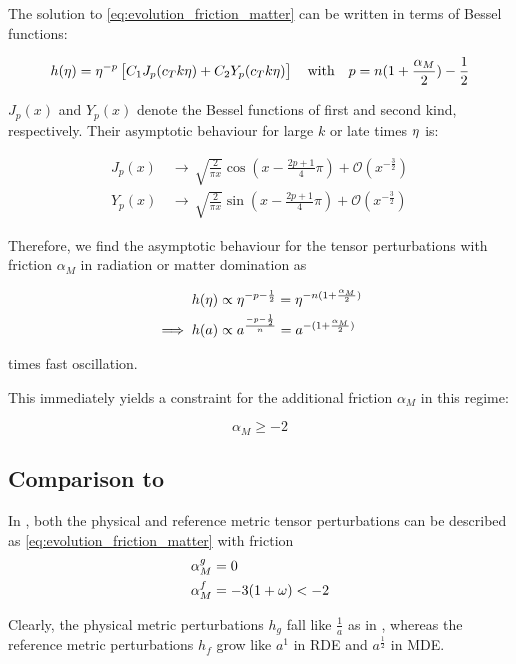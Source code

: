 \documentclass[parskip=half]{scrreprt}
\begin{document}
The solution to \ref{eq:evolution_friction_matter} can be written in terms of Bessel functions:

\begin{equation}
	h(\eta) = \eta^{-p} \left[C_1 J_p(c_T k \eta) + C_2 Y_p(c_T k \eta) \right] \quad \textrm{with} \quad p = n(1+\frac{\alpha_M}{2})-\frac{1}{2}
\end{equation}

$J_p(x)$ and $Y_p(x)$ denote the Bessel functions of first and second kind, respectively. Their asymptotic behaviour for large $k$ or late times $\eta$ is:

\begin{align}
	J_p(x) \, &\rightarrow \, \sqrt{\frac{2}{\pi x}} \cos(x-\frac{2p+1}{4}\pi) + \mathcal{O}(x^{-\frac{3}{2}}) \\
	Y_p(x) \, &\rightarrow \, \sqrt{\frac{2}{\pi x}} \sin(x-\frac{2p+1}{4}\pi) + \mathcal{O}(x^{-\frac{3}{2}})
\end{align}

Therefore, we find the asymptotic behaviour for the tensor perturbations with friction $\alpha_M$ in radiation or matter domination as

\begin{align}
	h(\eta) &\propto \eta^{-p-\frac{1}{2}} = \eta^{-n(1+\frac{\alpha_M}{2})} \\
	\implies h(a) &\propto a^{\frac{-p-\frac{1}{2}}{n}} = a^{-(1+\frac{\alpha_M}{2})}
\end{align}

times fast oscillation.

This immediately yields a constraint for the additional friction $\alpha_M$ in this regime:

\begin{equation}
	\alpha_M \geq -2
\end{equation}


\subsection{Comparison to \cite{Amendola2015}}

In \citep{Amendola2015}, both the physical and reference metric tensor perturbations can be described as \ref{eq:evolution_friction_matter} with friction
\begin{align}
	\alpha_M^{g} &= 0 \\
	\alpha_M^{f} &= -3(1+\omega) < -2
\end{align}

Clearly, the physical metric perturbations $h_g$ fall like $\frac{1}{a}$ as in \LambdaCDM, whereas the reference metric perturbations $h_f$ grow like $a^1$ in RDE and $a^\frac{1}{2}$ in MDE.
\end{document}
